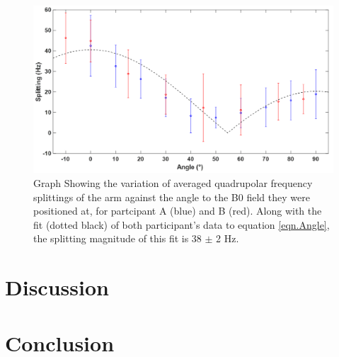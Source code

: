 \documentclass[class=article, crop=false]{standalone}
\begin{document}
\begin{figure}
    \centering
    \includegraphics[width=1\textwidth]{Figures/Quad/Split_Angle_1.png}
    \caption{Graph Showing the variation of averaged quadrupolar frequency splittings of the arm against the angle to the B0 field they were positioned at, for partcipant A (blue) and B (red). Along with the fit (dotted black) of both participant's data to equation \ref{eqn.Angle}, the splitting magnitude of this fit is 38 $\pm$ 2 Hz.}
    \label{fig:D2O:Split_Angle}
\end{figure}

\section{Discussion}

\section{Conclusion}

\printbibliography %
\end{document}
